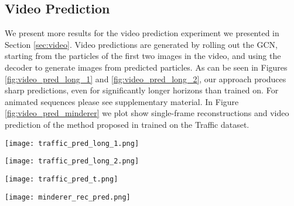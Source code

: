 \documentclass[nohyperref]{article}
\theoremstyle{plain}
\theoremstyle{definition}
\theoremstyle{remark}
\begin{document}
\subsection{Video Prediction}
\label{apndx:video_pred_res}
We present more results for the video prediction experiment we presented in Section \ref{sec:video}. Video predictions are generated by rolling out the GCN, starting from the particles of the first two images in the video, and using the decoder to generate images from predicted particles.
As can be seen in Figures \ref{fig:video_pred_long_1} and \ref{fig:video_pred_long_2}, our approach produces sharp predictions, even for significantly longer horizons than trained on. For animated sequences please see supplementary material. In Figure \ref{fig:video_pred_minderer} we plot show single-frame reconstructions and video prediction of the method proposed in \citet{minderer2019unsupervised} trained on the Traffic dataset.

\begin{figure*}[h]
     \centering
     \texttt{[image: traffic\_pred\_long\_1.png]}
        \caption{Video prediction on the Traffic dataset. We use the pre-trained \texttt{Object} model to provide the particle-representation and a GNN to predict the temporal change in particles. Top - ground truth, bottom - prediction.}
        \label{fig:video_pred_long_1}
\end{figure*}

\begin{figure*}[h]
     \centering
     \texttt{[image: traffic\_pred\_long\_2.png]}
        \caption{Video prediction on the Traffic dataset. We use the pre-trained \texttt{Object} model to provide the particle-representation and a GNN to predict the temporal change in particles. Top - ground truth, bottom - prediction.}
        \label{fig:video_pred_long_2}
\end{figure*}

\begin{figure*}[h]
     \centering
     \texttt{[image: traffic\_pred\_t.png]}
        \caption{Video prediction on the Traffic dataset. We use the pre-trained \texttt{Object} model to provide the particle-representation and a GNN to predict the temporal change in particles. Top - ground truth, bottom - prediction.}
        \label{fig:video_pred_t}
\end{figure*}

\begin{figure*}[h]
     \centering
     \texttt{[image: minderer\_rec\_pred.png]}
        \caption{Video prediction baseline (Minderer et al.) on Traffic. Second row: reconstructions of KeyNet; third row: dynamics prediction by \citet{minderer2019unsupervised}}
        \label{fig:video_pred_minderer}
\end{figure*}
\end{document}
